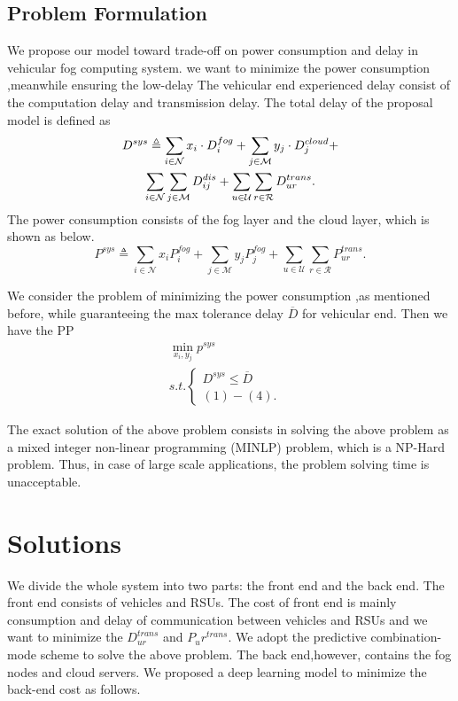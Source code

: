 \documentclass[journal]{IEEEtran}
\begin{document}
\subsection{Problem Formulation}
We propose our model toward trade-off on power consumption and delay in vehicular fog computing system. we want to minimize the power consumption ,meanwhile ensuring the low-delay	The vehicular end experienced delay consist of the computation delay and transmission delay.
The total delay of the proposal model is defined as
\begin{gather}
D^{sys} \triangleq \sum_{i \in \mathcal{N}} x_i \cdot D_i^{fog} + \sum_{j \in \mathcal{M}} y_j \cdot D_j^{cloud} + \notag \\
 \sum_{i \in \mathcal{N}}\sum_{j \in \mathcal{M}} D_{ij}^{dis}+ \sum_{u \in \mathcal{U}}\sum_{r \in \mathcal{R}} D_{ur}^{trans}.
\end{gather}
The power consumption consists of the fog layer and the cloud layer, which is shown as below.
$$
P^{sys} \triangleq \sum_{i \in \mathcal{N}}x_iP_i^{fog} + \sum_{j \in \mathcal{M}} y_jP_j^{fog}+\sum_{u \in \mathcal{U}}\sum_{r \in \mathcal{R}} P_{ur}^{trans}.
$$

We consider the problem of minimizing the power consumption ,as mentioned before, while guaranteeing the max tolerance delay $\overline{D}$ for vehicular end. Then we have the PP
\begin{equation}
\begin{split}
%
\min_{x_i,y_j} p^{sys}  \\  
s.t.\left\{
\begin{array}{lr}
D^{sys} \leq \overline{D} &  \\
(1)-(4). &
\end{array}
\right.
%	
\end{split}
\end{equation}


The exact solution of the above problem consists in solving the above problem as  a mixed integer non-linear
programming (MINLP) problem, which is a NP-Hard problem. Thus, in case of large scale applications, the problem solving time is unacceptable.
\section{Solutions}
We divide the whole system into two parts: the front end and the back end. The front end consists of vehicles and RSUs. The cost of front end is mainly consumption and delay of communication between vehicles and RSUs and we want to minimize the $D_{ur}^{trans}$ and $P_ur^{trans}$. We adopt the predictive combination-mode scheme to solve the above problem. The back end,however, contains the fog nodes and cloud servers. We proposed a deep learning model to minimize the back-end cost as follows.
\end{document}
